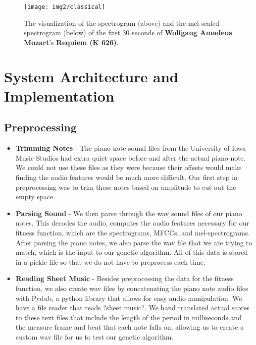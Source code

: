 \documentclass{pnastwo}
\begin{document}
\begin{article}
\begin{figure}
\centerline{\texttt{[image: img2/classical]}}
\caption{The visualization of the spectrogram (above) and the mel-scaled spectrogram (below) of the first 30 seconds of \textbf{Wolfgang Amadeus Mozart}'s \textbf{Requiem (K 626)}.}\label{fig3}
\end{figure}


\section{System Architecture and Implementation}
\subsection{Preprocessing}
 \begin{itemize}
 \item \textbf{Trimming Notes} - 
 The piano note sound files from the University of Iowa Music Studios had extra quiet space before and after the actual piano note. We could not use these files as they were because their offsets would make finding the audio features would be much more difficult. Our first step in preprocessing was to trim these notes based on amplitude to cut out the empty space.\\
 
 \item \textbf{Parsing Sound} -
 We then parse through the wav sound files of our piano notes. This decodes the audio, computes the audio features necessary for our fitness function, which are the spectrograms, MFCCs, and mel-spectrograms. After parsing the piano notes, we also parse the wav file that we are trying to match, which is the input to our genetic algorithm. All of this data is stored in a pickle file so that we do not have to preprocess each time.\\
 
 \item \textbf{Reading Sheet Music} -
 Besides preprocessing the data for the fitness function, we also create wav files by concatenating the piano note audio files with Pydub, a python library that allows for easy audio manipulation. We have a file reader that reads ?sheet music?. We hand translated actual scores to these text files that include the length of the period in milliseconds and the measure frame and beat that each note falls on, allowing us to create a custom wav file for us to test our genetic algorithm.\\
\end{itemize}

\end{article}
\end{document}
